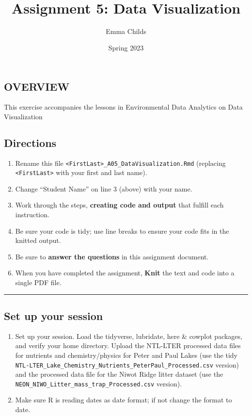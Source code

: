 \documentclass[
]{article}
\title{Assignment 5: Data Visualization}
\author{Emma Childs}
\date{Spring 2023}
\providecommand{\tightlist}{%
  \setlength{\itemsep}{0pt}\setlength{\parskip}{0pt}}
\begin{document}
\maketitle

\hypertarget{overview}{%
\subsection{OVERVIEW}\label{overview}}

This exercise accompanies the lessons in Environmental Data Analytics on
Data Visualization

\hypertarget{directions}{%
\subsection{Directions}\label{directions}}

\begin{enumerate}
\def\labelenumi{\arabic{enumi}.}
\tightlist
\item
  Rename this file
  \texttt{\textless{}FirstLast\textgreater{}\_A05\_DataVisualization.Rmd}
  (replacing \texttt{\textless{}FirstLast\textgreater{}} with your first
  and last name).
\item
  Change ``Student Name'' on line 3 (above) with your name.
\item
  Work through the steps, \textbf{creating code and output} that fulfill
  each instruction.
\item
  Be sure your code is tidy; use line breaks to ensure your code fits in
  the knitted output.
\item
  Be sure to \textbf{answer the questions} in this assignment document.
\item
  When you have completed the assignment, \textbf{Knit} the text and
  code into a single PDF file.
\end{enumerate}

\begin{center}\rule{0.5\linewidth}{0.5pt}\end{center}

\hypertarget{set-up-your-session}{%
\subsection{Set up your session}\label{set-up-your-session}}

\begin{enumerate}
\def\labelenumi{\arabic{enumi}.}
\item
  Set up your session. Load the tidyverse, lubridate, here \& cowplot
  packages, and verify your home directory. Upload the NTL-LTER
  processed data files for nutrients and chemistry/physics for Peter and
  Paul Lakes (use the tidy
  \texttt{NTL-LTER\_Lake\_Chemistry\_Nutrients\_PeterPaul\_Processed.csv}
  version) and the processed data file for the Niwot Ridge litter
  dataset (use the
  \texttt{NEON\_NIWO\_Litter\_mass\_trap\_Processed.csv} version).
\item
  Make sure R is reading dates as date format; if not change the format
  to date.
\end{enumerate}
\end{document}

